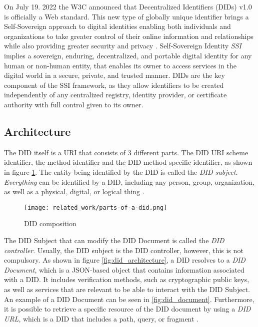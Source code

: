 On July 19. 2022 the W3C announced that Decentralized Identifiers (DIDs) v1.0 is officially a Web standard. This new type of globally unique identifier brings a Self-Sovereign approach to digital identities enabling both individuals and organizations to take greater control of their online information and relationships while also providing greater security and privacy \cite{w3c_2022}. Self-Sovereign Identity \emph{SSI} implies a sovereign, enduring, decentralized, and portable digital identity for any human or non-human entity, that enables its owner to access services in the digital world in a secure, private, and trusted manner. DIDs are the key component of the SSI framework, as they allow identifiers to be created independently of any centralized registry, identity provider, or certificate authority with full control given to its owner\cite{Naik_Jenkins_2021}\cite{sporny_longley_sabadello_reed_steele_2021}. 

\subsection{Architecture}

The DID itself is a URI that consists of 3 different parts. The DID URI scheme identifier, the method identifier and the DID method-specific identifier, as shown in figure \ref{fig:did}. The entity being identified by the DID is called the \emph{DID subject}. \emph{Everything} can be identified by a DID, including any person, group, organization, as well as a physical, digital, or logical thing \cite{Conway_Hughes_Ma_Poole_Riedel_2019}\cite{sporny_longley_sabadello_reed_steele_2021}.

\begin{figure}[h]
  \centering
  \texttt{[image: related\_work/parts-of-a-did.png]}
  \caption{DID composition \cite{sporny_longley_sabadello_reed_steele_2021}}
  \label{fig:did}
\end{figure}


The DID Subject that can modify the DID Document is called the \emph{DID controller}. Usually, the DID subject is the DID controller, however, this is not compulsory. As shown in figure \ref{fig:did_architecture}, a DID resolves to a \emph{DID Document}, which is a JSON-based object that contains information associated with a DID. It includes verification methods, such as cryptographic public keys, as well as services that are relevant to be able to interact with the DID Subject. An example of a DID Document can be seen in \ref{fig:did_document}. Furthermore, it is possible to retrieve a specific resource of the DID document by using a \emph{DID URL}, which is a DID that includes a path, query, or fragment \cite{sporny_longley_sabadello_reed_steele_2021}.


